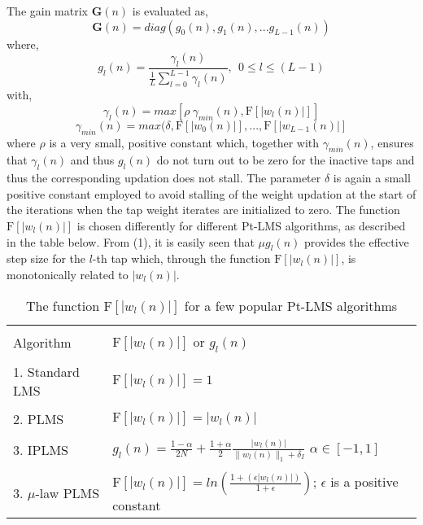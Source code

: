 \documentclass[journal, one column]{IEEEtran}
\begin{document}
The gain matrix $\textbf{G}(n)$ is evaluated as,
\begin{equation}\label{eq1.2}
 \textbf{G}(n)=diag(g_{0}(n),g_{1}(n),...g_{L-1}(n))
\end{equation}
where,
\begin{equation}\label{eq1.3}
g_{l}(n)=\frac{\gamma_{l}(n)}{\frac{1}{L} \sum\limits_{l=0}^{L-1}\gamma_{l}(n)}, \mspace{8mu} 0\leq l \leq (L-1)
\end{equation}
with,
\begin{equation}\label{eq1.4}
\gamma_{ l}(n)=max[\rho\mspace{4mu} \gamma_{min}(n), \mathrm{F}[|w_{l}(n)|]]
\end{equation}
\begin{equation}\label{eq1.5}
\gamma_{min}(n)=max(\delta, \mathrm{F}[|w_{0}(n)|],...,\mathrm{F}[|w_{L-1}(n)|]
\end{equation}
where $\rho$ is a very small, positive constant which, together
with $\gamma_{min}(n)$, ensures that $\gamma_{l}(n)$ and thus
$g_{l}(n)$ do not turn out to be zero for the inactive taps and
thus the corresponding updation does not stall. The parameter
$\delta$ is again a small positive constant employed to avoid
stalling of the weight updation at the start of the iterations
when the tap weight iterates are initialized to zero. The function
$\mathrm{F}[|w_{l}(n)|]$ is chosen differently for different
Pt-LMS algorithms, as described in the table below. From (1), it
is easily seen that $\mu g_l(n)$ provides the effective step size
for the $l$-th tap which, through the function
$\mathrm{F}[|w_{l}(n)|]$, is monotonically related to $|w_l(n)|$.
\begin{table}[h!]
\centering
\caption {The function $\mathrm{F}[|w_{l}(n)|]$ for a few popular
Pt-LMS algorithms}
    \begin{tabular}{ | l | p{4.5cm} |}
    \hline \\[-1.0em]
    Algorithm & $\mathrm{F}[|w_{l}(n)|]$ or $g_{l}(n)$ \\ [ 2ex]\hline \\[-1.0em]
    1. Standard LMS & $\mathrm{F}[|w_{l}(n)|] =1$ \\ [ 2ex]\hline \\[-1.0em]
    2. PLMS & $\mathrm{F}[|w_{l}(n)|] = |w_{l}(n)|$ \\ [ 2ex] \hline \\[-1.0em]
    3. IPLMS & $g_{l}(n) = \frac{1-\alpha}{2N} +  \frac{1+\alpha}{2}\frac{|w_{l}(n)|}{\|w_{l}(n)\|_{1}+\delta_{I}}$\hspace{1em} $\alpha \in [-1, 1]$ \\ [ 2ex] \hline \\[-1.0em]
    3. $\mu$-law PLMS & $\mathrm{F}[|w_{l}(n)|]=ln(\frac{1+( \epsilon |w_{l}(n)|)}{1+\epsilon})$; \hspace{1em} $\epsilon$ is a positive constant \\ \hline

    \end{tabular}
\end{table}
\end{document}
